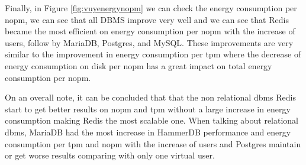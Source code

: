     
    Finally, in Figure \ref{fig:vuyenergynopm} we can check the energy consumption per \gls{nopm}, we can see that all DBMS improve very well and we can see that Redis became the most efficient on energy consumption per 
\gls{nopm} with the increase of users, follow by MariaDB, Postgres, and MySQL. These improvements are very similar to the improvement in energy consumption per \gls{tpm} where the decrease of energy consumption on disk per \gls{nopm} has a great impact on total energy consumption per \gls{nopm}.
    


  On an overall note, it can be concluded that that the non relational \gls{dbms} Redis start to get better results on  \gls{nopm} and \gls{tpm} without a large increase in energy consumption making Redis the most scalable one. When talking about relational \gls{dbms}, MariaDB had the most increase in HammerDB performance and energy consumption per \gls{tpm} and \gls{nopm} with the increase of users and Postgres maintain or get worse results comparing with only one virtual user.











